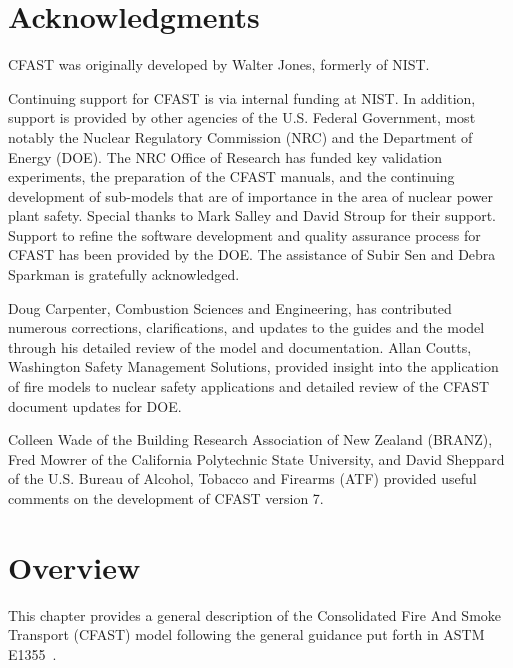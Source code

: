 \documentclass[12pt,twoside]{book}
\begin{document}

%
%

\chapter{Acknowledgments}

\label{acksection}

CFAST was originally developed by Walter Jones, formerly of NIST.

Continuing support for CFAST is via internal funding at NIST. In addition, support is provided by other agencies of the U.S. Federal Government, most notably the Nuclear Regulatory Commission (NRC) and the Department of Energy (DOE). The NRC Office of Research has funded key validation experiments, the preparation of the CFAST manuals, and the continuing development of sub-models that are of importance in the area of nuclear power plant safety. Special thanks to Mark Salley and David Stroup for their support. Support to refine the software development and quality assurance process for CFAST has been provided by the DOE. The assistance of Subir Sen and Debra Sparkman is gratefully acknowledged.

Doug Carpenter, Combustion Sciences and Engineering, has contributed numerous corrections, clarifications, and updates to the guides and the model through his detailed review of the model and documentation. Allan Coutts, Washington Safety Management Solutions, provided insight into the application of fire models to nuclear safety applications and detailed review of the CFAST document updates for DOE.

Colleen Wade of the Building Research Association of New Zealand (BRANZ), Fred Mowrer of the California Polytechnic State University, and David Sheppard of the U.S. Bureau of Alcohol, Tobacco and Firearms (ATF) provided useful comments on the development of CFAST version 7.


\tableofcontents

\listoffigures


\mainmatter

%
%

\chapter{Overview}

This chapter provides a general description of the Consolidated Fire And Smoke Transport (CFAST) model following the general guidance put forth in ASTM E1355~\cite{ASTM:E1355}.
\end{document}
